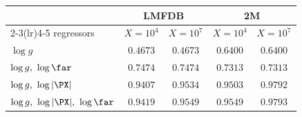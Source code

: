 \begin{tabular}{@{}l cc cc@{}}
\toprule
 & \multicolumn{2}{c}{LMFDB} & \multicolumn{2}{c}{2M}\\
\cmidrule(lr){2-3}\cmidrule(lr){4-5}
regressors & $X=10^{4}$ & $X=10^{7}$ & $X=10^{4}$ & $X=10^{7}$\\
\midrule
$\log g$ & $0.4673$ & $0.4673$ & $0.6400$ & $0.6400$\\
$\log g,\ \log\far$ & $0.7474$ & $0.7474$ & $0.7313$ & $0.7313$\\
$\log g,\ \log|\PX|$ & $0.9407$ & $0.9534$ & $0.9503$ & $0.9792$\\
$\log g,\ \log|\PX|,\ \log\far$ & $0.9419$ & $0.9549$ & $0.9549$ & $0.9793$\\
\bottomrule
\end{tabular}
